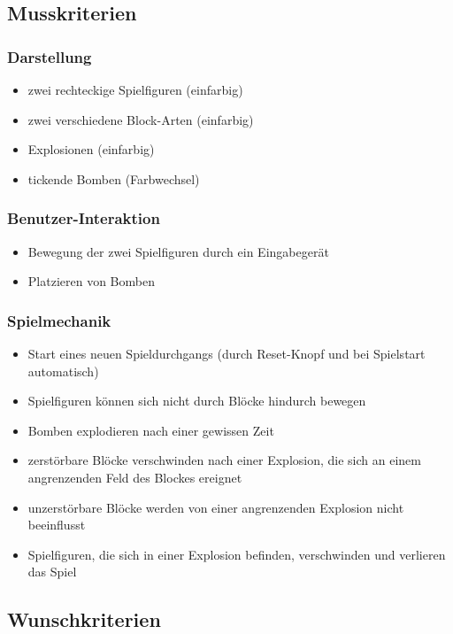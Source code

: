 \documentclass[parskip=full]{scrartcl}
\begin{document}
		\subsection{Musskriterien}
			\subsubsection{Darstellung}
				\begin{itemize}[noitemsep]
					\item zwei rechteckige Spielfiguren (einfarbig)
					\item zwei verschiedene Block-Arten (einfarbig)
					\item Explosionen (einfarbig)
					\item tickende Bomben (Farbwechsel)
				\end{itemize}
				
			\subsubsection{Benutzer-Interaktion}
				\begin{itemize}[noitemsep]
					\item Bewegung der zwei Spielfiguren durch ein Eingabegerät
					\item Platzieren von Bomben
				\end{itemize}
				
			\subsubsection{Spielmechanik}
				\begin{itemize}[noitemsep]
					\item Start eines neuen Spieldurchgangs (durch Reset-Knopf und bei Spielstart automatisch)
					\item Spielfiguren können sich nicht durch Blöcke hindurch bewegen
					\item Bomben explodieren nach einer gewissen Zeit
					\item zerstörbare Blöcke verschwinden nach einer Explosion, die sich an einem angrenzenden Feld des Blockes ereignet
					\item unzerstörbare Blöcke werden von einer angrenzenden Explosion nicht beeinflusst
					\item Spielfiguren, die sich in einer Explosion befinden, verschwinden und verlieren das Spiel
				\end{itemize}
		
		\subsection{Wunschkriterien}
\end{document}
